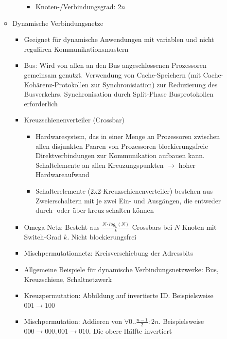 \begin{itemize}
\begin{itemize}
\begin{itemize}
\begin{itemize}
				\item Knoten-/Verbindungsgrad: \(2n\)
			\end{itemize}
		\end{itemize}
		\item Dynamische Verbindungsnetze
		\begin{itemize}
			\item Geeignet für dynamische Anwendungen mit variablen und nicht regulären Kommunikationsmustern
			\item Bus: Wird von allen an den Bus angeschlossenen Prozessoren gemeinsam genutzt. Verwendung von Cache-Speichern (mit Cache-Kohärenz-Protokollen zur Synchronisiation) zur Reduzierung des Busverkehrs. Synchronisation durch Split-Phase Busprotokollen erforderlich
			\item Kreuzschienenverteiler (Crossbar)
			\begin{itemize}
				\item Hardwaresystem, das in einer Menge an Prozessoren zwischen allen disjunkten Paaren von Prozessoren blockierungsfreie Direktverbindungen zur Kommunikation aufbauen kann. Schaltelemente an allen Kreuzungspunkten \(\rightarrow\) hoher Hardwareaufwand
				\item Schalterelemente (2x2-Kreuzschienenverteiler) bestehen aus Zweierschaltern mit je zwei Ein- und Ausgängen, die entweder durch- oder über kreuz schalten können
			\end{itemize}
			\item Omega-Netz: Besteht aus \(\frac{N\cdot log_k(N)}{k}\) Crossbars bei \(N\) Knoten mit Switch-Grad \(k\). Nicht blockierungsfrei
			\item Mischpermutationnetz: Kreisverschiebung der Adressbits
			\item Allgemeine Beispiele für dynamische Verbindungsnetzwerke: Bus, Kreuzschiene, Schaltnetzwerk
			\item Kreuzpermutation: Abbildung auf invertierte ID. Beispielsweise \(001 \longrightarrow 100\)
			\item Mischpermutation: Addieren von \(\forall 0..\frac{n-1}{2}:2n\). Beispielsweise \(000 \longrightarrow 000, 001 \longrightarrow 010\). Die obere Hälfte invertiert
		\end{itemize}
	\end{itemize}
\end{itemize}


